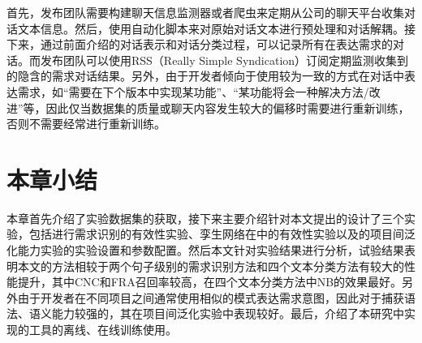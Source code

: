 首先，发布团队需要构建聊天信息监测器或者爬虫来定期从公司的聊天平台收集对话文本信息。然后，使用自动化脚本\cite{kummerfeld2018large}来对原始对话文本进行预处理和对话解耦。接下来，通过前面介绍的对话表示和对话分类过程，{\tool}可以记录所有在表达需求的对话。而发布团队可以使用RSS（Really Simple Syndication）订阅定期监测收集到的隐含的需求对话结果。另外，由于开发者倾向于使用较为一致的方式在对话中表达需求，如“需要在下个版本中实现某功能”、“某功能将会一种解决方法/改进”等，因此仅当数据集的质量或聊天内容发生较大的偏移时{\tool}需要进行重新训练，否则{\tool}不需要经常进行重新训练。

\section{本章小结}

本章首先介绍了实验数据集的获取，接下来主要介绍针对本文提出的{\tool}设计了三个实验，包括{\tool}进行需求识别的有效性实验、孪生网络在{\tool}中的有效性实验以及{\tool}的项目间泛化能力实验的实验设置和参数配置。然后本文针对实验结果进行分析，试验结果表明本文的方法相较于两个句子级别的需求识别方法和四个文本分类方法有较大的性能提升，其中CNC和FRA召回率较高，在四个文本分类方法中NB的效果最好。另外由于开发者在不同项目之间通常使用相似的模式表达需求意图，因此对于捕获语法、语义能力较强的{\tool}，其在项目间泛化实验中表现较好。最后，介绍了本研究中实现的{\tool}工具的离线、在线训练使用。